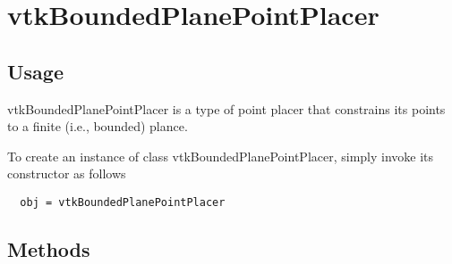 \section{vtkBoundedPlanePointPlacer}

\subsection{Usage}

 vtkBoundedPlanePointPlacer is a type of point placer that constrains its
 points to a finite (i.e., bounded) plance.


To create an instance of class vtkBoundedPlanePointPlacer, simply
invoke its constructor as follows
\begin{verbatim}
  obj = vtkBoundedPlanePointPlacer
\end{verbatim}
\subsection{Methods}

